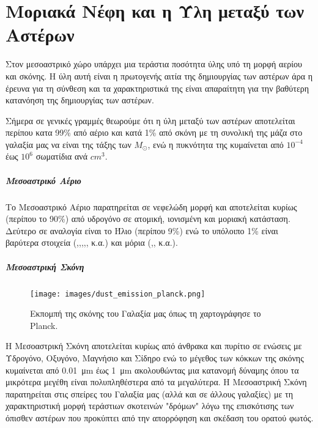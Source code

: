 \documentclass[a4paper,12pt]{memoir}
\newcommand{\sm}{$M_{\odot}$}
\begin{document}
\chapter{Μοριακά Νέφη και η Ύλη μεταξύ των Αστέρων}

Στον μεσοαστρικό χώρο υπάρχει μια τεράστια ποσότητα ύλης  υπό τη μορφή αερίου και σκόνης. Η ύλη αυτή είναι η πρωτογενής αιτία της δημιουργίας των αστέρων άρα η έρευνα για τη σύνθεση και τα χαρακτηριστικά της είναι απαραίτητη για την βαθύτερη κατανόηση της δημιουργίας των αστέρων.

Σήμερα σε γενικές γραμμές θεωρούμε ότι η ύλη μεταξύ των αστέρων αποτελείται περίπου κατα 99\% από αέριο και κατά 1\% από σκόνη με τη συνολική της μάζα στο γαλαξία μας να είναι της τάξης των \sm {}, ενώ η πυκνότητα της κυμαίνεται από $10^{-4}$ έως $10^{6}$ σωματίδια ανά $cm^3$.

\paragraph{Μεσοαστρικό Αέριο} 
Το Μεσοαστρικό Αέριο παρατηρείται σε νεφελώδη μορφή και αποτελείται κυρίως (περίπου το 90\%) από υδρογόνο σε ατομική, ιονισμένη και μοριακή κατάσταση. Δεύτερο σε αναλογία είναι το Ήλιο (περίπου 9\%) ενώ το υπόλοιπο 1\% είναι βαρύτερα στοιχεία (,,,,, κ.α.) και μόρια (,, κ.α.).

\paragraph{Μεσοαστρική Σκόνη}
\begin{figure}[h!]
	\centering
	\texttt{[image: images/dust\_emission\_planck.png]}
	\caption{Εκπομπή της σκόνης του Γαλαξία μας όπως τη χαρτογράφησε το Planck.}
\end{figure}

Η Μεσοαστρική Σκόνη αποτελείται κυρίως από άνθρακα και πυρίτιο σε ενώσεις με Υδρογόνο, Οξυγόνο, Μαγνήσιο και Σίδηρο ενώ το μέγεθος των κόκκων της σκόνης κυμαίνεται από \SI{0.01}{\micro\meter} έως \SI{1}{\micro\meter} ακολουθώντας μια κατανομή δύναμης όπου τα μικρότερα μεγέθη είναι πολυπληθέστερα από τα μεγαλύτερα. 
Η Μεσοαστρική Σκόνη παρατηρείται στις σπείρες του Γαλαξία μας (αλλά και σε άλλους γαλαξίες) με τη χαρακτηριστική μορφή τεράστιων σκοτεινών "δρόμων" λόγω της επισκότισης των όπισθεν αστέρων που προκύπτει από την απορρόφηση και σκέδαση του ορατού φωτός.
\end{document}
